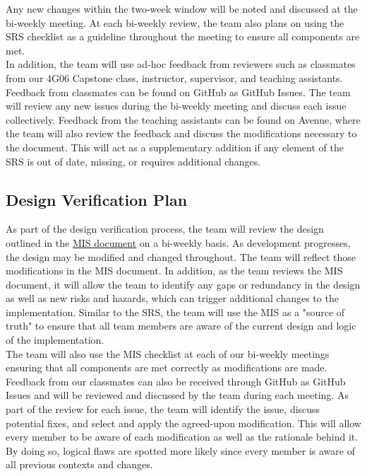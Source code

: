 \documentclass[12pt, titlepage]{article}
\begin{document}
\noindent Any new changes within the two-week window will be noted and discussed at the bi-weekly meeting. At each bi-weekly review, the team also plans on using the SRS checklist as a guideline throughout
the meeting to ensure all components are met.\\

\noindent  In addition, the team will use ad-hoc feedback from reviewers such as classmates from our 4G06 Capstone class, instructor, supervisor, and teaching assistants. Feedback from classmates can be found on GitHub as GitHub Issues. The team will review any new issues during the bi-weekly meeting and discuss each issue collectively. Feedback from the teaching assistants can be found on Avenue, where the team will also review the feedback and discuss the modifications necessary to the document. This will act as a supplementary addition if any element of the SRS 
is out of date, missing, or requires additional changes.

\subsection{Design Verification Plan}

As part of the design verification process, the team will review the design outlined in the \href{../Design/SoftDetailedDes/MIS.pdf}{MIS document} on a bi-weekly basis. As development progresses, the design may be modified and changed throughout. The team will reflect those modifications in the MIS document. In addition, as the team reviews the MIS document, it will allow the team to identify any gaps or redundancy in the design as well as new risks and hazards, which can trigger additional changes to the implementation. Similar to the SRS, the team will use the MIS as a "source of truth" to ensure that all team members are aware of the current design and logic of the implementation. \\

\noindent The team will also use the MIS checklist at each of our bi-weekly meetings ensuring that all components are met correctly as modifications are made. Feedback from our classmates can also be received through GitHub as GitHub Issues and will be reviewed and discussed by the team during each meeting. As part of the review for each issue, the team will identify the issue, discuss potential fixes, and select and apply the agreed-upon modification. This will allow every member to be aware of each modification as well as the rationale behind it. By doing so, logical flaws are spotted more likely since every member is aware of all previous contexts and changes. 
\end{document}
